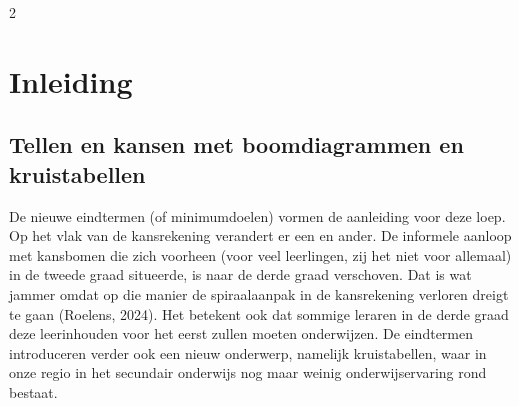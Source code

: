 


\startcontents[inhoudloep]	%

\begin{multicols}{2}
	
	\inhoudstafelloep			%






	
\section{Inleiding}

\subsection*{Tellen en kansen met boomdiagrammen en kruistabellen}

De nieuwe eindtermen (of minimumdoelen) vormen de aanleiding voor deze loep. Op het vlak van de kansrekening verandert er een en ander. De informele aanloop met kansbomen die zich voorheen (voor veel leerlingen, zij het niet voor allemaal) in de tweede graad situeerde, is naar de derde graad verschoven. Dat is wat jammer omdat op die manier de spiraalaanpak in de kansrekening verloren dreigt te gaan (Roelens, 2024). Het betekent ook dat sommige leraren in de derde graad deze leerinhouden voor het eerst zullen moeten onderwijzen. De eindtermen introduceren verder ook een nieuw onderwerp, namelijk kruistabellen, waar in onze regio in het secundair onderwijs nog maar weinig onderwijservaring rond bestaat.


\end{multicols}
